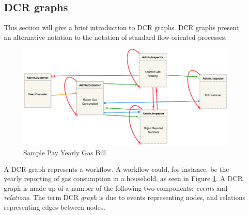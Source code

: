 \subsection{DCR graphs}
This section will give a brief introduction to DCR graphs. DCR graphs present an alternative notation to the notation of standard flow-oriented processes.

\begin{figure}[h!]
\center
\includegraphics[width=\linewidth]{Figures/gas}
\caption{\label{SampleGasFlow} Sample Pay Yearly Gas Bill }
\end{figure}

A DCR graph represents a workflow. A workflow could, for instance, be the yearly reporting of gas consumption in a household, as seen in Figure \ref{SampleGasFlow}. A DCR graph is made up of a number of the following two components: \textit{events} and \textit{relations}. The term DCR \textit{graph} is due to events representing nodes, and relations representing edges between nodes.



